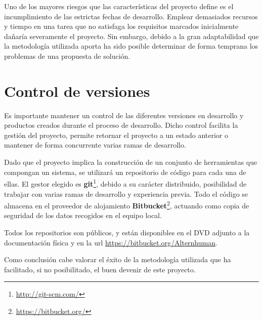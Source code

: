 Uno de los mayores riesgos que las características del proyecto define es el incumplimiento de las estrictas fechas de desarrollo. Emplear demasiados recursos y tiempo en una tarea que no satisfaga los requisitos marcados inicialmente dañaría severamente el proyecto. Sin embargo, debido a la gran adaptabilidad que la metodología utilizada aporta ha sido posible determinar de forma temprana los problemas de una propuesta de solución.

\section{Control de versiones}

Es importante mantener un control de las diferentes versiones en desarrollo y productos creados durante el proceso de desarrollo. Dicho control facilita la gestión del proyecto, permite retornar el proyecto a un estado anterior o mantener de forma concurrente varias ramas de desarrollo.

Dado que el proyecto implica la construcción de un conjunto de herramientas que compongan un sistema, se utilizará un repositorio de código para cada una de ellas. El gestor elegido es \textbf{git}\footnote{\href{http://git-scm.com/}{http://git-scm.com/}}, debido a su carácter distribuido, posibilidad de trabajar con varias ramas de desarrollo y experiencia previa. Todo el código se almacena en el proveedor de alojamiento \textbf{Bitbucket}\footnote{\href{https://bitbucket.org/}{https://bitbucket.org/}}, actuando como copia de seguridad de los datos recogidos en el equipo local. 

Todos los repositorios son públicos, y están disponibles en el DVD adjunto a la documentación física y en la url \href{https://bitbucket.org/Alternhuman}{https://bitbucket.org/Alternhuman}.

Como conclusión cabe valorar el éxito de la metodología utilizada que ha facilitado, si no posibilitado, el buen devenir de este proyecto.

